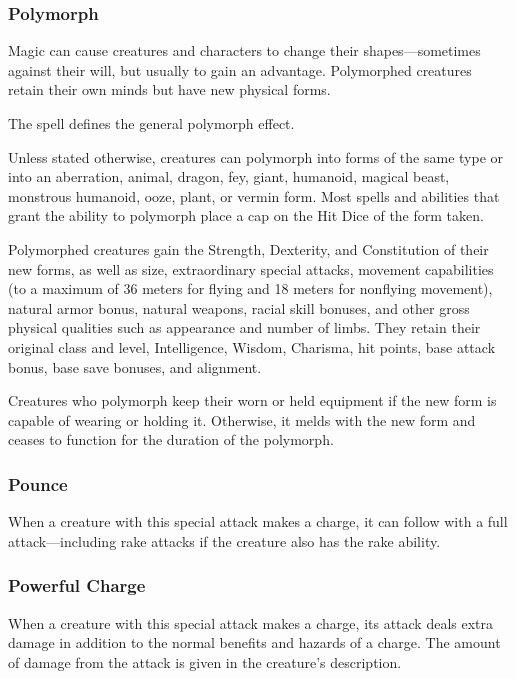 \subsubsection{Polymorph}
Magic can cause creatures and characters to change their shapes---sometimes against their will, but usually to gain an advantage. Polymorphed creatures retain their own minds but have new physical forms.

The  spell defines the general polymorph effect.

Unless stated otherwise, creatures can polymorph into forms of the same type or into an aberration, animal, dragon, fey, giant, humanoid, magical beast, monstrous humanoid, ooze, plant, or vermin form. Most spells and abilities that grant the ability to polymorph place a cap on the Hit Dice of the form taken.

Polymorphed creatures gain the Strength, Dexterity, and Constitution of their new forms, as well as size, extraordinary special attacks, movement capabilities (to a maximum of 36 meters for flying and 18 meters for nonflying movement), natural armor bonus, natural weapons, racial skill bonuses, and other gross physical qualities such as appearance and number of limbs. They retain their original class and level, Intelligence, Wisdom, Charisma, hit points, base attack bonus, base save bonuses, and alignment.

Creatures who polymorph keep their worn or held equipment if the new form is capable of wearing or holding it. Otherwise, it melds with the new form and ceases to function for the duration of the polymorph.

\subsubsection{Pounce}
When a creature with this special attack makes a charge, it can follow with a full attack---including rake attacks if the creature also has the rake ability.

\subsubsection{Powerful Charge}
When a creature with this special attack makes a charge, its attack deals extra damage in addition to the normal benefits and hazards of a charge. The amount of damage from the attack is given in the creature's description.


